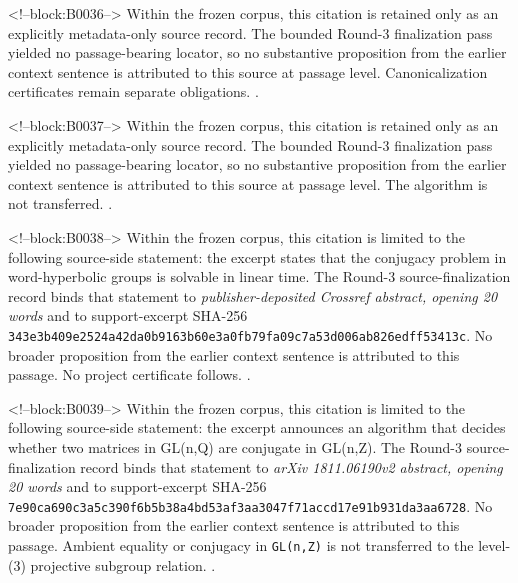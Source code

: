\documentclass[11pt,a4paper]{article}
\begin{document}
<!--block:B0036-->
Within the frozen corpus, this citation is retained only as an explicitly metadata-only source record. The bounded Round-3 finalization pass yielded no passage-bearing locator, so no substantive proposition from the earlier context sentence is attributed to this source at passage level. Canonicalization certificates remain separate obligations.
\citep{P29-S16}.

<!--block:B0037-->
Within the frozen corpus, this citation is retained only as an explicitly metadata-only source record. The bounded Round-3 finalization pass yielded no passage-bearing locator, so no substantive proposition from the earlier context sentence is attributed to this source at passage level. The algorithm is not transferred.
\citep{P29-S12}.

<!--block:B0038-->
Within the frozen corpus, this citation is limited to the following source-side statement: the excerpt states that the conjugacy problem in word-hyperbolic groups is solvable in linear time. The Round-3 source-finalization record binds that statement to \emph{publisher-deposited Crossref abstract, opening 20 words} and to support-excerpt SHA-256 \texttt{343e3b40\allowbreak{}9e2524a4\allowbreak{}2da0b916\allowbreak{}3b60e3a0\allowbreak{}fb79fa09\allowbreak{}c7a53d00\allowbreak{}6ab826ed\allowbreak{}ff53413c}. No broader proposition from the earlier context sentence is attributed to this passage. No project certificate follows.
\citep{P29-S13}.

<!--block:B0039-->
Within the frozen corpus, this citation is limited to the following source-side statement: the excerpt announces an algorithm that decides whether two matrices in GL(n,Q) are conjugate in GL(n,Z). The Round-3 source-finalization record binds that statement to \emph{arXiv 1811.06190v2 abstract, opening 20 words} and to support-excerpt SHA-256 \texttt{7e90ca69\allowbreak{}0c3a5c39\allowbreak{}0f6b5b38\allowbreak{}a4bd53af\allowbreak{}3aa3047f\allowbreak{}71accd17\allowbreak{}e91b931d\allowbreak{}a3aa6728}. No broader proposition from the earlier context sentence is attributed to this passage. Ambient equality or conjugacy in \texttt{GL(n,Z)} is not transferred to the level-(3) projective subgroup relation.
\citep{P29-S14}.
\end{document}
